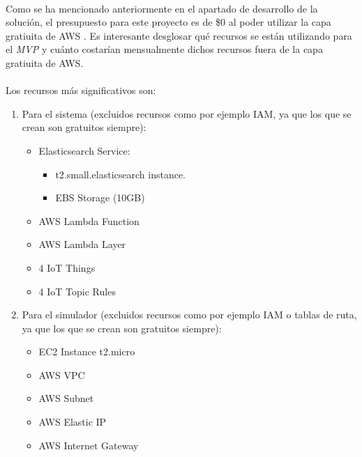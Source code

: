 \documentclass[../../memoria.tex]{subfiles}
\begin{document}
\paragraph{}
Como se ha mencionado anteriormente en el apartado de desarrollo de la solución, el presupuesto para este proyecto es de \$0 al poder utilizar la capa gratiuita de AWS \cite{awsfreetier}. Es interesante desglosar qué recursos se están utilizando para el \textit{MVP} y cuánto costarían mensualmente dichos recursos fuera de la capa gratiuita de AWS.

\paragraph{}
Los recursos más significativos son:

\begin{enumerate}

    \item Para el sistema (excluidos recursos como por ejemplo IAM, ya que los que se crean son gratuitos siempre):

          \begin{itemize}
              \item Elasticsearch Service:
                    \begin{itemize}
                        \item t2.small.elasticsearch instance.
                        \item EBS Storage (10GB)
                    \end{itemize}

              \item AWS Lambda Function
              \item AWS Lambda Layer
              \item 4 IoT Things
              \item 4 IoT Topic Rules
          \end{itemize}

    \item Para el simulador (excluidos recursos como por ejemplo IAM o tablas de ruta, ya que los que se crean son gratuitos siempre):
          \begin{itemize}
              \item EC2 Instance t2.micro
              \item AWS VPC
              \item AWS Subnet
              \item AWS Elastic IP
              \item AWS Internet Gateway
          \end{itemize}
\end{enumerate}
\end{document}
